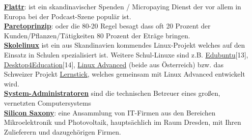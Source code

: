 \href{http://flattr.com}{\textbf{Flattr}}: ist ein skandinavischer Spenden / Micropaying Dienst der vor allem in Europa bei der Podcast-Szene populär ist. \\

\href{http://de.wikipedia.org/wiki/Paretoprinzip}{\textbf{Paretoprinzip}}: oder die 80-20 Regel besagt dass oft 20 Prozent der Kunden/Pflanzen/Tätigkeiten 80 Prozent der Eträge bringen. \\

\href{http://www.skolelinux.org/}{\textbf{Skolelinux}} ist ein aus Skandinavien kommendes Linux-Projekt welches auf den Einsatz in Schulen spezialisiert ist. Weitere Schul-Linuxe sind z.B. \href{http://www.edubuntu.org/}{Edubuntu}[13], \href{http://d4e.at/}{Desktop4Education}[14], \href{http://www.linuxadvanced.at/}{Linux Advanced} (beide aus Österreich) bzw. das Schweizer Projekt \href{http://www.imedias.ch/lernstick}{Lernstick}, welches gemeinsam mit Linux Advanced entwickelt wird. \\


\href{http://de.wikipedia.org/wiki/Systemadministrator}{\textbf{System-Administratoren}} sind die technischen Betreuer eines großen, vernetzten Computersystems\\

\href{http://de.wikipedia.org/wiki/Silicon_Saxony}{\textbf{Silicon Saxony}}: eine Ansammlung von IT-Firmen aus den Bereichen Mikroelektronik und Photovoltaik, hauptsächlich im Raum Dresden, mit Ihren Zulieferern und dazugehörigen Firmen.
